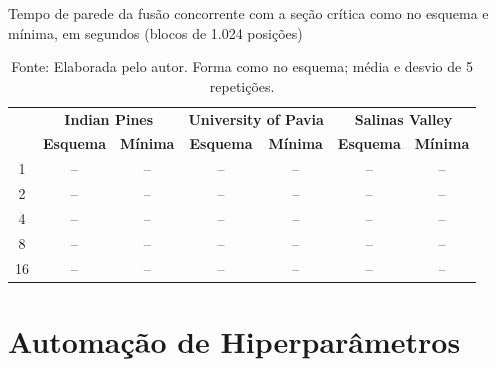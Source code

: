 \begin{table}[H]
    \centering
    \caption{Tempo de parede da fusão concorrente com a seção crítica como no esquema e mínima, em segundos (blocos de 1.024 posições)}
    \footnotesize
    \setlength{\tabcolsep}{3pt}
    \begin{tabular}{|c|c|c|c|c|c|c|}
        \hline
        \rowcolor[HTML]{C0C0C0}
        \multirow{2}{*}{\textbf{$N$}} & \multicolumn{2}{c|}{\textbf{Indian Pines}} & \multicolumn{2}{c|}{\textbf{University of Pavia}} & \multicolumn{2}{c|}{\textbf{Salinas Valley}} \\
        \cline{2-7}
        \rowcolor[HTML]{C0C0C0}
        & \textbf{Esquema} & \textbf{Mínima} & \textbf{Esquema} & \textbf{Mínima} & \textbf{Esquema} & \textbf{Mínima} \\
        \hline
        1 & -- & -- & -- & -- & -- & -- \\ \hline
        2 & -- & -- & -- & -- & -- & -- \\ \hline
        4 & -- & -- & -- & -- & -- & -- \\ \hline
        8 & -- & -- & -- & -- & -- & -- \\ \hline
        16 & -- & -- & -- & -- & -- & -- \\ \hline
    \end{tabular}
    \captionsetup{justification=raggedright}
    \caption*{Fonte: Elaborada pelo autor. Forma como no esquema; média e desvio de 5 repetições. }
    \label{tab:fusaoSecao}
\end{table}

\section{Automação de Hiperparâmetros}

